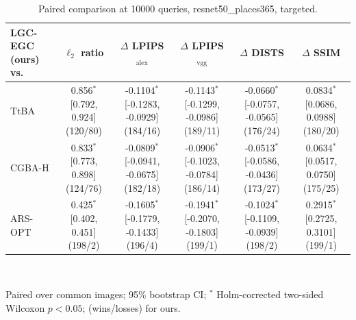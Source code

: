 \begin{table}[t]
\centering\footnotesize
\caption{Paired comparison at 10000 queries, resnet50\_places365, targeted.}
\begin{tabular}{lccccc}
\toprule
LGC-EGC (ours) vs. & $\ell_2$ ratio & $\Delta$ LPIPS$_{\mathrm{alex}}$ & $\Delta$ LPIPS$_{\mathrm{vgg}}$ & $\Delta$ DISTS & $\Delta$ SSIM \\
\midrule
TtBA & 0.856$^{*}$ [0.792, 0.924] (120/80) & -0.1104$^{*}$ [-0.1283, -0.0929] (184/16) & -0.1143$^{*}$ [-0.1299, -0.0986] (189/11) & -0.0660$^{*}$ [-0.0757, -0.0565] (176/24) & 0.0834$^{*}$ [0.0686, 0.0988] (180/20) \\
CGBA-H & 0.833$^{*}$ [0.773, 0.898] (124/76) & -0.0809$^{*}$ [-0.0941, -0.0675] (182/18) & -0.0906$^{*}$ [-0.1023, -0.0784] (186/14) & -0.0513$^{*}$ [-0.0586, -0.0436] (173/27) & 0.0634$^{*}$ [0.0517, 0.0750] (175/25) \\
ARS-OPT & 0.425$^{*}$ [0.402, 0.451] (198/2) & -0.1605$^{*}$ [-0.1779, -0.1433] (196/4) & -0.1941$^{*}$ [-0.2070, -0.1803] (199/1) & -0.1024$^{*}$ [-0.1109, -0.0939] (198/2) & 0.2915$^{*}$ [0.2725, 0.3101] (199/1) \\
\bottomrule
\end{tabular}
\\[2pt]\parbox{\linewidth}{\scriptsize Paired over common images; 95\% bootstrap CI; $^{*}$ Holm-corrected two-sided Wilcoxon $p<0.05$; (wins/losses) for ours.}
\end{table}
